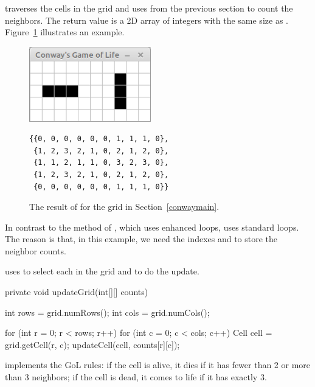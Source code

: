 traverses the cells in the grid and uses  from the previous section to count the neighbors.
The return value is a 2D array of integers with the same size as .
Figure~\ref{fig:countNeigh} illustrates an example.

\begin{figure}[!ht]
\begin{center}
\begin{minipage}{160pt}
\includegraphics[trim=0 0 0 23pt,clip,width=150pt]{figs/conway.png}
\end{minipage}
\begin{minipage}{200pt}
\begin{verbatim}
{{0, 0, 0, 0, 0, 0, 1, 1, 1, 0},
 {1, 2, 3, 2, 1, 0, 2, 1, 2, 0},
 {1, 1, 2, 1, 1, 0, 3, 2, 3, 0},
 {1, 2, 3, 2, 1, 0, 2, 1, 2, 0},
 {0, 0, 0, 0, 0, 0, 1, 1, 1, 0}}
\end{verbatim}
\end{minipage}
\caption{The result of  for the grid in Section~\ref{conwaymain}.}
\label{fig:countNeigh}
\end{center}
\end{figure}

In contrast to the  method of , which uses enhanced  loops,  uses standard  loops.
The reason is that, in this example, we need the indexes  and  to store the neighbor counts.

 uses  to select each  in the grid and  to do the update.

\begin{code}
private void updateGrid(int[][] counts) {
    int rows = grid.numRows();
    int cols = grid.numCols();

    for (int r = 0; r < rows; r++) {
        for (int c = 0; c < cols; c++) {
            Cell cell = grid.getCell(r, c);
            updateCell(cell, counts[r][c]);
        }
    }
}
\end{code}

 implements the GoL rules: if the cell is alive, it dies if it has fewer than 2 or more than 3 neighbors; if the cell is dead, it comes to life if it has exactly 3.

